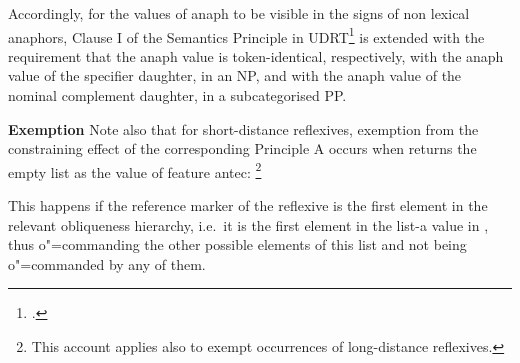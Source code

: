 \documentclass[output=paper
	        ,collection
	        ,collectionchapter
 	        ,biblatex
                ,babelshorthands
                ,newtxmath
                ,draftmode
                ,colorlinks, citecolor=brown
]{langscibook}
\begin{document}
Accordingly, for the values of {\sc anaph} to be
visible in the signs of non lexical anaphors, 
Clause I of the Semantics Principle in UDRT\footnote{
\citep[]{frank:sem95}.}
is extended with the
requirement that the {\sc anaph} value is token-identical,
respectively, with
the {\sc anaph} value of the specifier daughter, in an NP, and 
with the {\sc anaph} value of the nominal complement daughter, in 
a subcategorised PP.


\textbf{Exemption} Note also that for short-distance reflexives, exemption from the constraining effect
of the corresponding Principle A occurs when
returns the empty list as the value of feature {\sc antec}:%
%
\footnote{
This account applies also to exempt occurrences of 
long-distance reflexives.}
%

\begin{exe}

\ex
{}
\avmfont{\sc}
\avmvalfont{\it}
\begin{avm}
\end{avm}
\end{exe}

This happens 
if the reference marker of the reflexive \raisebox{-0.085cm}{
\begin{avm}
\@2
\end{avm}}
is the first element in the relevant
obliqueness hierarchy, i.e.\ it is the first element 
in the {\sc list-a} value in \raisebox{-0.085cm}{
\begin{avm}
\@3
\end{avm}},
thus \mbox{o"=commanding} the other possible elements of this list and not being
\mbox{o"=commanded} by any of them. 
\end{document}
